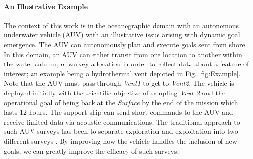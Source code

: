 \paragraph{An Illustrative Example} 

The context of this work is in the oceanographic domain with an
autonomous underwater vehicle (AUV) with an illustrative issue arising
with dynamic goal emergence. The AUV can autonomously plan and execute
goals sent from shore. In this domain, an AUV can either transit from
one location to another within the water column, or survey a location
in order to collect data about a feature of interest; an example being
a hydrothermal vent depicted in Fig. \ref{fig:Example}.  Note that the
AUV must pass through {\em Vent1} to get to {\em Vent2}.  The vehicle
is deployed initially with the scientific objective of sampling {\em
  Vent 2} and the operational goal of being back at the {\em Surface} by
the end of the mission which lasts $12$ hours. The support ship can
send short commands to the AUV and receive limited data via acoustic
communications.  The traditional approach to such AUV surveys has been
to separate exploration and exploitation into two different surveys
\cite{Yoerger01012007}.  By improving how the vehicle handles the
inclusion of new goals, we can greatly improve the efficacy of such
surveys.

